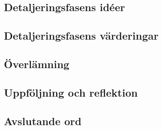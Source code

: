 \documentclass[a4paper,12pt]{article}
\begin{document}
\subsection{Detaljeringsfasens idéer}
\subsection{Detaljeringsfasens värderingar}
\subsection{Överlämning}
\subsection{Uppföljning och reflektion}
\subsection{Avslutande ord}
\end{document}
